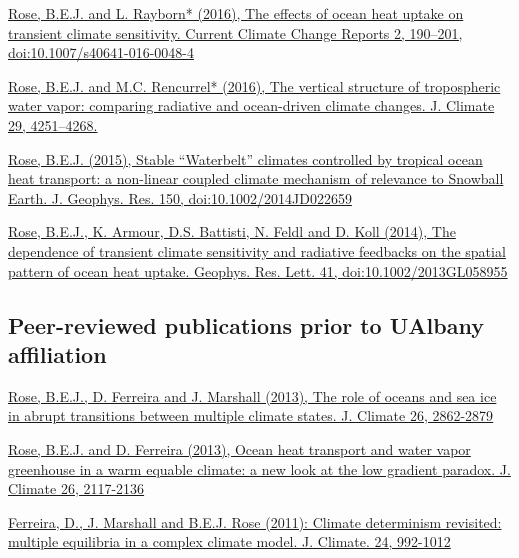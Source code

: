 \documentclass[11pt, letterpaper]{article} %
\newcommand{\years}[1]{\marginnote{\scriptsize #1}} %
\newcommand{\publink}{http://www.atmos.albany.edu/facstaff/brose/resources/Publications/}
\begin{document}
\href{\publink Rose_Rayborn_CCCR2016.pdf}{\underline{Rose, B.E.J.} and L. Rayborn* (2016), The effects of ocean heat uptake on transient climate sensitivity. Current Climate Change Reports 2, 190--201, doi:10.1007/s40641-016-0048-4}
\vspace{0.2 cm}
   
\href{\publink Rose_Rencurrel_JClim2016.pdf}{\underline{Rose, B.E.J.} and M.C. Rencurrel* (2016), The vertical structure of tropospheric water vapor: comparing radiative and ocean-driven climate changes. J. Climate 29, 4251--4268.}
\vspace{0.2 cm}
 
\years{2015}  
\href{\publink Rose_JGR2015.pdf}{\underline{Rose, B.E.J.} (2015), Stable ``Waterbelt'' climates controlled by tropical ocean heat transport: a non-linear coupled climate mechanism of relevance to Snowball Earth. J. Geophys. Res. 150, doi:10.1002/2014JD022659}
\vspace{0.2 cm}
 
\years{2014}  
\href{\publink Rose_etal_GRL2014.pdf}{\underline{Rose, B.E.J.}, K. Armour, D.S. Battisti, N. Feldl and D. Koll (2014), The dependence of transient climate sensitivity and radiative feedbacks on the spatial pattern of ocean heat uptake. Geophys. Res. Lett. 41, doi:10.1002/2013GL058955}
  
\subsection*{Peer-reviewed publications prior to UAlbany affiliation} 
 
\years{2013}  
\href{\publink Rose_etal_transitions_JClim2013.pdf}{\underline{Rose, B.E.J.}, D. Ferreira and J. Marshall (2013), The role of oceans and sea ice in abrupt transitions between multiple climate states. J. Climate 26, 2862-2879}
\vspace{0.2 cm}

\href{\publink Rose_Ferreira_JClim2013.pdf}{\underline{Rose, B.E.J.} and D. Ferreira (2013), Ocean heat transport and water vapor greenhouse in a warm equable climate: a new look at the low gradient paradox. J. Climate 26, 2117-2136}
\vspace{0.2 cm}

\years{2011}  
\href{\publink FMR_JClim2011_MultipleEq.pdf}{Ferreira, D., J. Marshall and \underline{B.E.J. Rose} (2011): Climate determinism revisited: multiple equilibria in a complex climate model. J. Climate. 24, 992-1012}
\vspace{0.2 cm}
  
\end{document}
